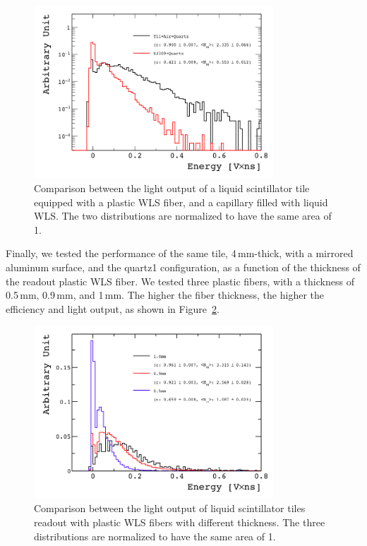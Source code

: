 \documentclass[review]{elsarticle}
\begin{document}
\begin{figure}[!ht]
\begin{center}
\includegraphics[width=0.8\textwidth]{./figures/list_RO_FIBER_all_norm.png}
\caption{Comparison between the light output of a liquid scintillator
  tile equipped with a plastic WLS fiber, and a capillary filled with
  liquid WLS. The two distributions are normalized to have the same area of 1.}
\label{fig:y11_vs_cap}
\end{center}
\end{figure}




Finally, we tested the performance of the same tile, 4\,mm-thick, with a
mirrored aluminum surface, and the quartz1 configuration,
as a function of the thickness of the
readout plastic WLS fiber. We tested three plastic fibers, with a
thickness of 0.5\,mm, 0.9\,mm, and 1\,mm. The higher the
fiber thickness, the higher the efficiency and light output, as shown
in Figure~\ref{fig:fiber_thickness_comp}.

\begin{figure}[!ht]
\begin{center}
\includegraphics[width=0.8\textwidth]{./figures/list_Fiber_Thickness_all_1.png}
\caption{Comparison between the light output of liquid scintillator
  tiles readout with plastic WLS fibers with different thickness. The
  three distributions are normalized to have the same area of 1.}
\label{fig:fiber_thickness_comp}
\end{center}
\end{figure}
\end{document}

